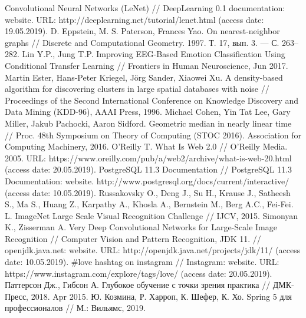 \begingroup 
\renewcommand{\section}[2]{\anonsection{Библиографический список}}
\onehalfspacing
\begin{thebibliography}{00}
    Convolutional Neural Networks (LeNet) // 
    DeepLearning 0.1 documentation: website. 
    URL: http://deeplearning.net/tutorial/lenet.html 
    (access date: 19.05.2019).
    D. Eppstein, M. S. Paterson, Frances Yao. 
    On nearest-neighbor graphs // 
    Discrete and Computational Geometry. 
    1997. Т. 17, вып. 3. — С. 263–282.
    Lin Y.P., Jung T.P.
    Improving EEG-Based Emotion Classification Using Conditional Transfer Learning //
    Frontiers in Human Neuroscience, 
    Jun 2017.
    Martin Ester, Hans-Peter Kriegel, Jörg Sander, Xiaowei Xu.
    A density-based algorithm for discovering clusters in large spatial databases with noise // 
    Proceedings of the Second International Conference on Knowledge Discovery and Data Mining (KDD-96),
    AAAI Press, 
    1996.
    Michael Cohen, Yin Tat Lee, Gary Miller, Jakub Pachocki, Aaron Sidford. 
    Geometric median in nearly linear time // 
    Proc. 48th Symposium on Theory of Computing (STOC 2016). Association for Computing Machinery, 
    2016.
    O'Reilly T. What Is Web 2.0 // 
    O’Reilly Media. 
    2005. 
    URL: https://www.oreilly.com/pub/a/web2/archive/what-is-web-20.html 
    (access date: 20.05.2019).
    PostgreSQL 11.3 Documentation // 
    PostgreSQL 11.3 Documentation: website. 
    http://www.postgresql.org/docs/current/interactive/
    (access date: 10.05.2019).
    Russakovsky O., Deng J., Su H., Krause J., Satheesh S., Ma S., Huang Z., Karpathy A., Khosla A., Bernstein M., Berg A.C., Fei-Fei. L. 
    ImageNet Large Scale Visual Recognition Challenge // 
    IJCV, 
    2015.
    Simonyan K., Zisserman A. 
    Very Deep Convolutional Networks for Large-Scale Image Recognition // 
    Computer Vision and Pattern Recognition, 
    JDK 11. // 
    openjdk.java.net: website. 
    URL: http://openjdk.java.net/projects/jdk/11/
    (access date: 10.05.2019).
    \#love hashtag on instagram // 
    Instagram: website. 
    URL: https://www.instagram.com/explore/tags/love/ 
    (access date: 20.05.2019).
    Паттерсон Дж., Гибсон А. 
    Глубокое обучение с точки зрения практика //
    ДМК-Пресс, 
    2018.
    Apr 2015.
    Ю. Козмина, Р. Харроп, К. Шефер, К. Хо. 
    Spring 5 для профессионалов //
    М.: Вильямс, 
    2019.

\end{thebibliography}
\endgroup

\clearpage